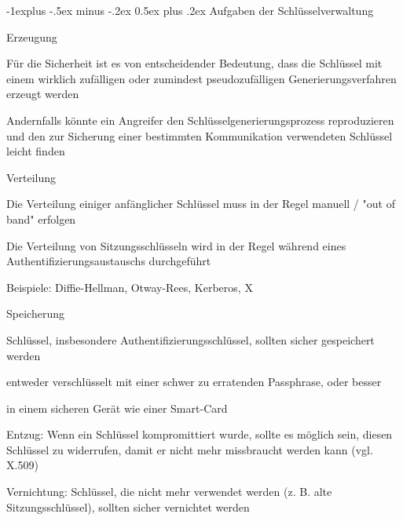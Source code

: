 \documentclass[a4paper]{article}
\makeatletter
\renewcommand{\subsection}{\@startsection{subsection}{2}{0mm}%
 {-1explus -.5ex minus -.2ex}%
 {0.5ex plus .2ex}%
 {\normalfont\normalsize\bfseries}}
\makeatother
\begin{document}
\begin{multicols}{3}
      \subsection{Aufgaben der Schlüsselverwaltung}
      \begin{itemize*}
            \item Erzeugung
            \begin{itemize*}
                  \item Für die Sicherheit ist es von entscheidender Bedeutung, dass die Schlüssel mit einem wirklich zufälligen oder zumindest pseudozufälligen Generierungsverfahren erzeugt werden
                  \item Andernfalls könnte ein Angreifer den Schlüsselgenerierungsprozess reproduzieren und den zur Sicherung einer bestimmten Kommunikation verwendeten Schlüssel leicht finden
            \end{itemize*}
            \item Verteilung
            \begin{itemize*}
                  \item Die Verteilung einiger anfänglicher Schlüssel muss in der Regel manuell / "out of band" erfolgen
                  \item Die Verteilung von Sitzungsschlüsseln wird in der Regel während eines Authentifizierungsaustauschs durchgeführt
                  \item Beispiele: Diffie-Hellman, Otway-Rees, Kerberos, X
            \end{itemize*}
            \item Speicherung
            \begin{itemize*}
                  \item Schlüssel, insbesondere Authentifizierungsschlüssel, sollten sicher gespeichert werden
                  \item entweder verschlüsselt mit einer schwer zu erratenden Passphrase, oder besser
                  \item in einem sicheren Gerät wie einer Smart-Card
            \end{itemize*}
            \item Entzug: Wenn ein Schlüssel kompromittiert wurde, sollte es möglich sein, diesen Schlüssel zu widerrufen, damit er nicht mehr missbraucht werden kann (vgl. X.509)
            \item Vernichtung: Schlüssel, die nicht mehr verwendet werden (z. B. alte Sitzungsschlüssel), sollten sicher vernichtet werden

\end{itemize*}
\end{multicols}
\end{document}
